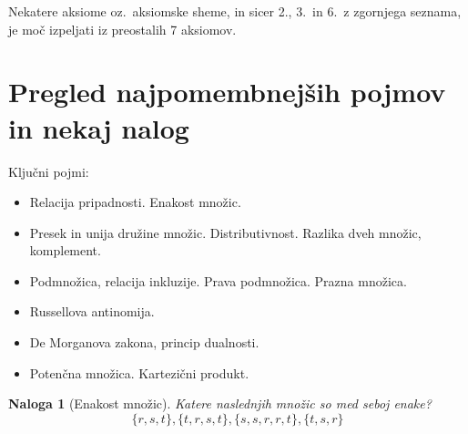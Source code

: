 \documentclass[11pt,paper=b5,footinclude,headinclude]{scrbook} %
\def\inn {{~\wedge~}}
\def\sledi {{~\Rightarrow~}}
\def\cee {{~\Leftrightarrow~}}
\def\zgled{\noindent\textbf{\color{blue} Zgled: }}
\newtheorem*{problem}{Naloga}
\begin{document}
\begin{enumerate}





\end{enumerate}

Nekatere aksiome oz.~aksiomske sheme, in sicer 2., 3.~in 6.~z zgornjega seznama, je moč izpeljati iz preostalih 7 aksiomov.

\section{Pregled najpomembnejših pojmov in nekaj nalog}

Ključni pojmi:
\begin{itemize}
  \item Relacija pripadnosti. Enakost množic.
  \item Presek in unija družine množic. Distributivnost. Razlika dveh množic, komplement.
  \item Podmnožica, relacija inkluzije. Prava podmnožica. Prazna množica.
  \item Russellova antinomija.
  \item De Morganova zakona, princip dualnosti.
  \item Potenčna množica. Kartezični produkt.
\end{itemize}

\begin{problem}[Enakost množic]
Katere naslednjih množic so med seboj enake?
$$\{r,s,t\}, \{t,r,s,t\}, \{s,s,r,r,t\}, \{t,s,r\}$$
\end{problem}
\end{document}
